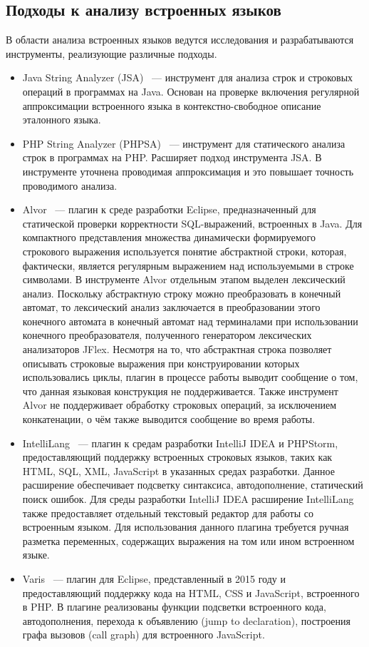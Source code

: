 \subsection{Подходы к анализу встроенных языков}
В области анализа встроенных языков ведутся исследования и разрабатываются инструменты, реализующие различные подходы. 
\begin{itemize}
\item Java String Analyzer (JSA)~\cite{JSA,JSAUrl} --- инструмент для анализа строк и строковых операций в программах на Java. Основан на проверке включения регулярной аппроксимации встроенного языка в контекстно-свободное описание эталонного языка.
\item PHP String Analyzer (PHPSA)~\cite{PHPSA,PHPSAUrl} --- инструмент для статического анализа строк в программах на PHP. Расширяет подход инструмента JSA. В инструменте уточнена проводимая аппроксимация и это повышает точность проводимого анализа. 
\item Alvor~\cite{AlvorUrl, Alvor2, Alvor1} --- плагин к среде разработки Eclipse, предназначенный для статической проверки корректности SQL-выражений, встроенных в Java. Для компактного представления множества динамически формируемого строкового выражения используется понятие абстрактной строки, которая, фактически, является регулярным выражением над используемыми в строке символами. В инструменте Alvor отдельным этапом выделен лексический анализ. Поскольку абстрактную строку можно преобразовать в конечный автомат, то лексический анализ заключается в преобразовании этого конечного автомата в конечный автомат над терминалами при использовании конечного преобразователя, полученного генератором лексических анализаторов JFlex. Несмотря на то, что абстрактная строка позволяет описывать строковые выражения при конструировании которых использовались циклы, плагин в процессе работы выводит сообщение о том, что данная языковая конструкция не поддерживается. Также инструмент Alvor не поддерживает обработку строковых операций, за исключением конкатенации, о чём также выводится сообщение во время работы.
\item IntelliLang~\cite{IntelliLang} --- плагин к средам разработки IntelliJ IDEA и PHPStorm, предоставляющий поддержку встроенных строковых языков, таких как HTML, SQL, XML, JavaScript в указанных средах разработки. Данное расширение обеспечивает подсветку синтаксиса, автодополнение, статический поиск ошибок. Для среды разработки IntelliJ IDEA расширение IntelliLang также предоставляет отдельный текстовый редактор для работы со встроенным языком. Для использования данного плагина требуется ручная разметка переменных, содержащих выражения на том или ином встроенном языке.
\item Varis~\cite{Varis} --- плагин для Eclipse, представленный в 2015 году и предоставляющий поддержку кода на HTML, CSS и JavaScript, встроенного в PHP. В плагине реализованы функции подсветки встроенного кода, автодополнения, перехода к объявлению (jump to declaration), построения графа вызовов (call graph) для встроенного JavaScript. 
\end{itemize}

